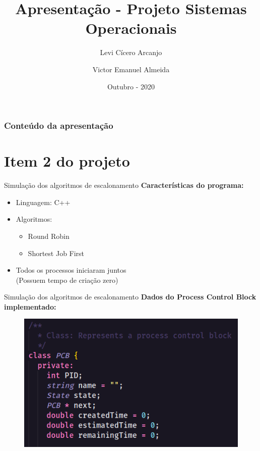 \documentclass{beamer}
\author[Levi, Victor]{Levi Cícero Arcanjo  \and Victor Emanuel Almeida}
\title{Apresentação - Projeto Sistemas Operacionais}
\date{Outubro - 2020}
\begin{document}
	\frame{\titlepage}
	\begin{frame}
		\frametitle{Conteúdo da apresentação}
		\tableofcontents
	\end{frame}
	
	
	\section{Item 2 do projeto}
	
	
\begin{frame}{Simulação dos algoritmos de escalonamento}
    \textbf{Características do programa:}
	\begin{itemize}
	    \item Linguagem: C++
		\item Algoritmos: 
		    \begin{itemize}
		        \item Round Robin
		        \item Shortest Job First
		    \end{itemize}
		 \item Todos os processos iniciaram juntos \\ (Possuem tempo de criação zero)
	\end{itemize}
\end{frame}

\begin{frame}{Simulação dos algoritmos de escalonamento}
    \textbf{Dados do Process Control Block implementado:}
	\begin{figure}[!htb]
		\centering
		\includegraphics[keepaspectratio, scale=.6]{PCB.png}
	\end{figure}
\end{frame}
\end{document}

